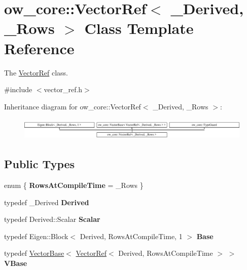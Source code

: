 \hypertarget{classow__core_1_1VectorRef}{}\section{ow\+\_\+core\+:\+:Vector\+Ref$<$ \+\_\+\+Derived, \+\_\+\+Rows $>$ Class Template Reference}
\label{classow__core_1_1VectorRef}


The \hyperlink{classow__core_1_1VectorRef}{Vector\+Ref} class.  




{\ttfamily \#include $<$vector\+\_\+ref.\+h$>$}

Inheritance diagram for ow\+\_\+core\+:\+:Vector\+Ref$<$ \+\_\+\+Derived, \+\_\+\+Rows $>$\+:\begin{figure}[H]
\begin{center}
\leavevmode
\includegraphics[height=1.085271cm]{de/d6a/classow__core_1_1VectorRef}
\end{center}
\end{figure}
\subsection*{Public Types}
\begin{DoxyCompactItemize}
\item 
enum \{ {\bfseries Rows\+At\+Compile\+Time} = \+\_\+\+Rows
 \}\hypertarget{classow__core_1_1VectorRef_a0e7598ad398296d7460fea9c20f237e3}{}\label{classow__core_1_1VectorRef_a0e7598ad398296d7460fea9c20f237e3}

\item 
typedef \+\_\+\+Derived {\bfseries Derived}\hypertarget{classow__core_1_1VectorRef_a7536251477ddb12a8c69099b2bd927f2}{}\label{classow__core_1_1VectorRef_a7536251477ddb12a8c69099b2bd927f2}

\item 
typedef Derived\+::\+Scalar {\bfseries Scalar}\hypertarget{classow__core_1_1VectorRef_a0639424922c1e3e6733c7e5f926321e3}{}\label{classow__core_1_1VectorRef_a0639424922c1e3e6733c7e5f926321e3}

\item 
typedef Eigen\+::\+Block$<$ Derived, Rows\+At\+Compile\+Time, 1 $>$ {\bfseries Base}\hypertarget{classow__core_1_1VectorRef_acb2331c78ff1906e3677734574fc0487}{}\label{classow__core_1_1VectorRef_acb2331c78ff1906e3677734574fc0487}

\item 
typedef \hyperlink{classow__core_1_1VectorBase}{Vector\+Base}$<$ \hyperlink{classow__core_1_1VectorRef}{Vector\+Ref}$<$ Derived, Rows\+At\+Compile\+Time $>$ $>$ {\bfseries V\+Base}\hypertarget{classow__core_1_1VectorRef_a084dbc673dd3f402985848a4f6ffa5d2}{}\label{classow__core_1_1VectorRef_a084dbc673dd3f402985848a4f6ffa5d2}

\end{DoxyCompactItemize}
